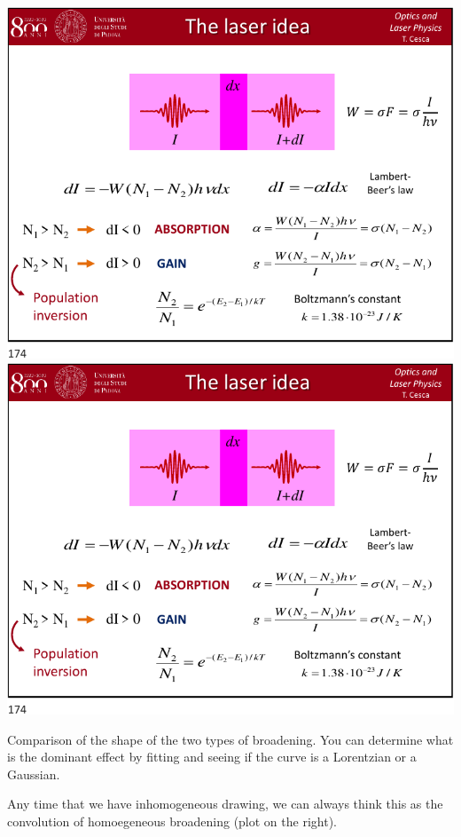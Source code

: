 \documentclass[../main/main.tex]{subfiles}
\begin{document}
\begin{minipage}[]{0.5\linewidth}
\centering
\includegraphics[page=9,width=1\textwidth]{../lessons/pdf_file/09_lecture.pdf}
\includegraphics[page=10,width=1\textwidth]{../lessons/pdf_file/09_lecture.pdf}
\end{minipage}
\hspace{0.3cm}\vspace{0.3cm}
\begin{minipage}[c]{0.47\linewidth}

Comparison of the shape of the two types of broadening. You can determine what is the dominant effect by fitting and seeing if the curve is a Lorentzian or a Gaussian.

Any time that we have inhomogeneous drawing, we can always think this as the convolution of homoegeneous broadening (plot on the right). 

\end{minipage}
\end{document}
